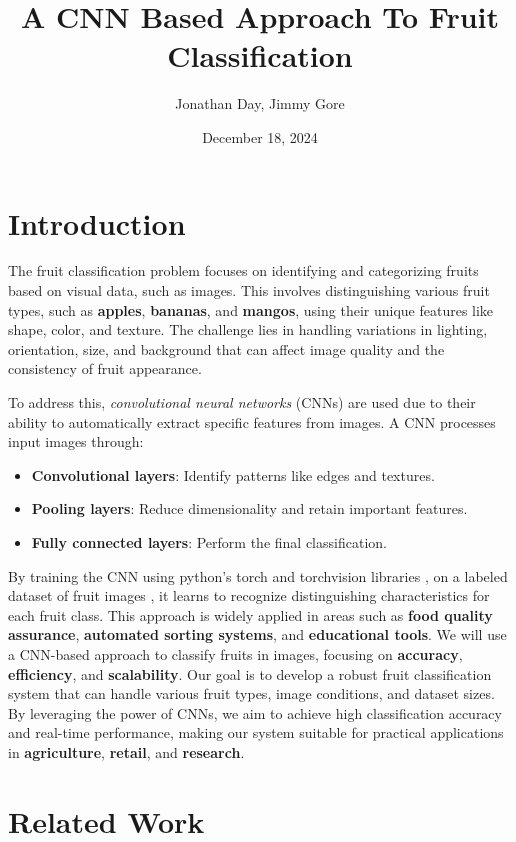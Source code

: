 \documentclass{article}
\title{A CNN Based Approach To Fruit Classification}
\author{Jonathan Day, Jimmy Gore}
\date{December 18, 2024}
\begin{document}
\maketitle

\section{Introduction}

The fruit classification problem focuses on identifying and categorizing fruits based on visual data, such as images. This involves distinguishing various fruit types, such as \textbf{apples}, \textbf{bananas}, and \textbf{mangos}, using their unique features like shape, color, and texture. The challenge lies in handling variations in lighting, orientation, size, and background that can affect image quality and the consistency of fruit appearance.

To address this, \emph{convolutional neural networks} (CNNs) are used due to their ability to automatically extract specific features from images. A CNN processes input images through:
\begin{itemize}
    \item \textbf{Convolutional layers}: Identify patterns like edges and textures.
    \item \textbf{Pooling layers}: Reduce dimensionality and retain important features.
    \item \textbf{Fully connected layers}: Perform the final classification.
\end{itemize}

By training the CNN using python's torch \cite{paszke2019pytorch}  and torchvision libraries \cite{pytorchvision}, on a labeled dataset of fruit images \cite{fruitsclassification}, it learns to recognize distinguishing characteristics for each fruit class. This approach is widely applied in areas such as \textbf{food quality assurance}, \textbf{automated sorting systems}, and \textbf{educational tools}. We will use a CNN-based approach to classify fruits in images, focusing on \textbf{accuracy}, \textbf{efficiency}, and \textbf{scalability}. Our goal is to develop a robust fruit classification system that can handle various fruit types, image conditions, and dataset sizes. By leveraging the power of CNNs, we aim to achieve high classification accuracy and real-time performance, making our system suitable for practical applications in \textbf{agriculture}, \textbf{retail}, and \textbf{research}.


\section{Related Work}
\end{document}
